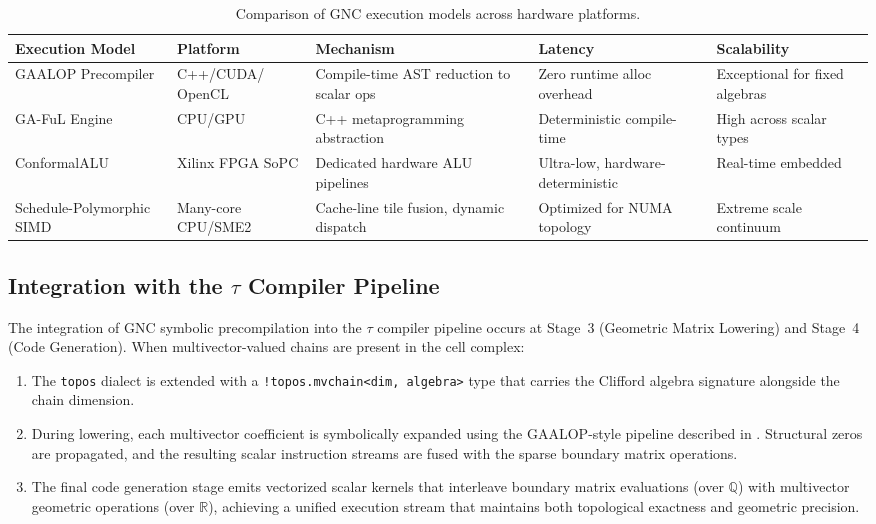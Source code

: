 \documentclass[manuscript, nonacm, review=false]{acmart}
\theoremstyle{definition}
\theoremstyle{plain}
\newcommand{\R}{\mathbb{R}}
\newcommand{\Q}{\mathbb{Q}}
\newcommand{\toposLang}{\ensuremath{\tau}\text{-Lang}}
\begin{document}
\begin{table}[h]
\centering
\small
\begin{tabular}{@{}p{3.2cm}p{2.2cm}p{3cm}p{2.5cm}p{2.5cm}@{}}
\toprule
\textbf{Execution Model} & \textbf{Platform} & \textbf{Mechanism} & \textbf{Latency} & \textbf{Scalability} \\
\midrule
GAALOP Precompiler & C++/CUDA/ OpenCL & Compile-time AST reduction to scalar ops & Zero runtime alloc overhead & Exceptional for fixed algebras \\
\addlinespace
GA-FuL Engine & CPU/GPU & C++ metaprogramming abstraction & Deterministic compile-time & High across scalar types \\
\addlinespace
ConformalALU & Xilinx FPGA SoPC & Dedicated hardware ALU pipelines & Ultra-low, hardware-deterministic & Real-time embedded \\
\addlinespace
Schedule-Polymorphic SIMD & Many-core CPU/SME2 & Cache-line tile fusion, dynamic dispatch & Optimized for NUMA topology & Extreme scale continuum \\
\bottomrule
\end{tabular}
\caption{Comparison of GNC execution models across hardware platforms.}
\label{tab:execution_models}
\end{table}


\subsection{Integration with the \toposLang{} Compiler Pipeline}
\label{subsec:gnc_compiler_integration}

The integration of GNC symbolic precompilation into the \toposLang{} compiler pipeline occurs at Stage~3 (Geometric Matrix Lowering) and Stage~4 (Code Generation). When multivector-valued chains are present in the cell complex:

\begin{enumerate}[label=(\alph*)]
    \item The \texttt{topos} dialect is extended with a \texttt{!topos.mvchain<dim, algebra>} type that carries the Clifford algebra signature alongside the chain dimension.
    
    \item During lowering, each multivector coefficient is symbolically expanded using the GAALOP-style pipeline described in . Structural zeros are propagated, and the resulting scalar instruction streams are fused with the sparse boundary matrix operations.
    
    \item The final code generation stage emits vectorized scalar kernels that interleave boundary matrix evaluations (over $\Q$) with multivector geometric operations (over $\R$), achieving a unified execution stream that maintains both topological exactness and geometric precision.
\end{enumerate}
\end{document}
